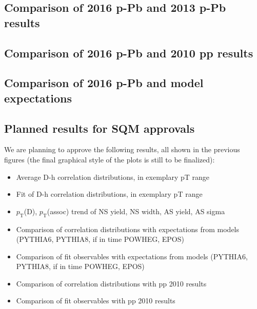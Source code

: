 \subsection{Comparison of 2016 p-Pb and 2013 p-Pb results}


\subsection{Comparison of 2016 p-Pb and 2010 pp results}


\subsection{Comparison of 2016 p-Pb and model expectations}


\subsection{Planned results for SQM approvals}
We are planning to approve the following results, all shown in the previous figures (the final graphical style of the plots is still to be finalized):
\begin{itemize}
\item Average D-h correlation distributions, in exemplary pT range
\item Fit of D-h correlation distributions, in exemplary pT range
\item $p_\text{T}$(D), $p_\text{T}$(assoc) trend of NS yield, NS width, AS yield, AS sigma
\item Comparison of correlation distributions with expectations from models (PYTHIA6, PYTHIA8, if in time POWHEG, EPOS)
\item Comparison of fit observables with expectations from models (PYTHIA6, PYTHIA8, if in time POWHEG, EPOS)
\item Comparison of correlation distributions with pp 2010 results
\item Comparison of fit observables with pp 2010 results
\end{itemize}

\clearpage
